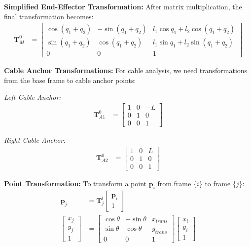 \documentclass[11pt,a4paper]{article}
\begin{document}
\textbf{Simplified End-Effector Transformation:}
After matrix multiplication, the final transformation becomes:
\begin{align}
\bm{T}_M^0 &= \begin{bmatrix}
\cos(q_1 + q_2) & -\sin(q_1 + q_2) & l_1\cos q_1 + l_2\cos(q_1 + q_2) \\
\sin(q_1 + q_2) & \cos(q_1 + q_2) & l_1\sin q_1 + l_2\sin(q_1 + q_2) \\
0 & 0 & 1
\end{bmatrix}
\end{align}

\textbf{Cable Anchor Transformations:}
For cable analysis, we need transformations from the base frame to cable anchor points:

\textit{Left Cable Anchor:}
\begin{align}
\bm{T}_{A1}^0 &= \begin{bmatrix}
1 & 0 & -L \\
0 & 1 & 0 \\
0 & 0 & 1
\end{bmatrix}
\end{align}

\textit{Right Cable Anchor:}
\begin{align}
\bm{T}_{A2}^0 &= \begin{bmatrix}
1 & 0 & L \\
0 & 1 & 0 \\
0 & 0 & 1
\end{bmatrix}
\end{align}

\textbf{Point Transformation:}
To transform a point $\bm{p}_i$ from frame $\{i\}$ to frame $\{j\}$:
\begin{align}
\bm{p}_j &= \bm{T}_j^i \begin{bmatrix} \bm{p}_i \\ 1 \end{bmatrix} \\
\begin{bmatrix} x_j \\ y_j \\ 1 \end{bmatrix} &= \begin{bmatrix}
\cos\theta & -\sin\theta & x_{trans} \\
\sin\theta & \cos\theta & y_{trans} \\
0 & 0 & 1
\end{bmatrix} \begin{bmatrix} x_i \\ y_i \\ 1 \end{bmatrix}
\end{align}
\end{document}
